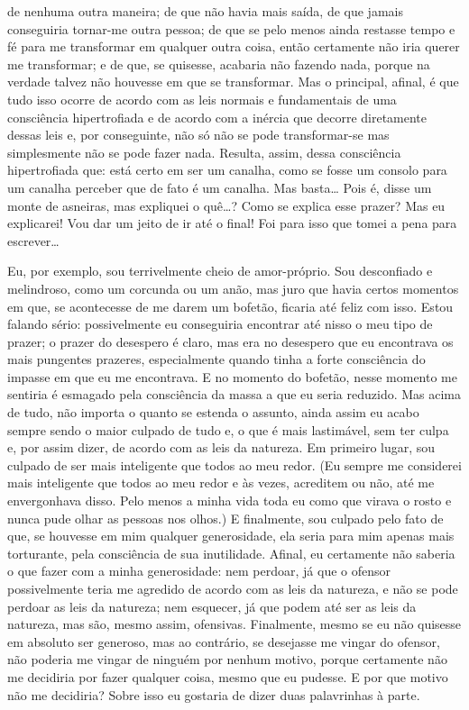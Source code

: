 de nenhuma outra maneira; de que não havia mais saída, de que jamais
conseguiria tornar-me outra pessoa; de que se pelo menos ainda restasse
tempo e fé para me transformar em qualquer outra coisa, então
certamente não iria querer me transformar; e de que, se quisesse,
acabaria não fazendo nada, porque na verdade talvez não houvesse em que
se transformar. Mas o principal, afinal, é que tudo isso ocorre de
acordo com as leis normais e fundamentais de uma consciência
hipertrofiada e de acordo com a inércia que decorre diretamente dessas
leis e, por conseguinte, não só não se pode transformar-se mas
simplesmente não se pode fazer nada. Resulta, assim, dessa consciência
hipertrofiada que: está certo em ser um canalha, como se fosse um
consolo para um canalha perceber que de fato é um canalha. Mas basta\ldots{}
Pois é, disse um monte de asneiras, mas expliquei o quê\ldots{}? Como se
explica esse prazer? Mas eu explicarei! Vou dar um jeito de ir até o
final! Foi para isso que tomei a pena para escrever\ldots{}

Eu, por exemplo, sou terrivelmente cheio de amor-próprio. Sou
desconfiado e melindroso, como um corcunda ou um anão, mas juro que
havia certos momentos em que, se acontecesse de me darem um bofetão,
ficaria até feliz com isso. Estou falando sério: possivelmente eu
conseguiria encontrar até nisso o meu tipo de prazer; o prazer do
desespero é claro, mas era no desespero que eu encontrava os mais
pungentes prazeres, especialmente quando tinha a forte consciência do
impasse em que eu me encontrava. E no momento do bofetão, nesse momento
me sentiria é esmagado pela consciência da massa a que eu seria
reduzido. Mas acima de tudo, não importa o quanto se estenda o assunto,
ainda assim eu acabo sempre sendo o maior culpado de tudo e, o que é
mais lastimável, sem ter culpa e, por assim dizer, de acordo com as
leis da natureza. Em primeiro lugar, sou culpado de ser mais
inteligente que todos ao meu redor. (Eu sempre me considerei mais
inteligente que todos ao meu redor e às vezes, acreditem ou não, até me
envergonhava disso. Pelo menos a minha vida toda eu como que virava o
rosto e nunca pude olhar as pessoas nos olhos.) E finalmente, sou
culpado pelo fato de que, se houvesse em mim qualquer generosidade, ela
seria para mim apenas mais torturante, pela consciência de sua
inutilidade. Afinal, eu certamente não saberia o que fazer com a minha
generosidade: nem perdoar, já que o ofensor possivelmente teria me
agredido de acordo com as leis da natureza, e não se pode perdoar as
leis da natureza; nem esquecer, já que podem até ser as leis da
natureza, mas são, mesmo assim, ofensivas. Finalmente, mesmo se eu
não quisesse em absoluto ser generoso, mas ao contrário, se desejasse
me vingar do ofensor, não poderia me vingar de ninguém por nenhum
motivo, porque certamente não me decidiria por fazer qualquer coisa,
mesmo que eu pudesse. E por que motivo não me decidiria? Sobre isso eu
gostaria de dizer duas palavrinhas à parte.


